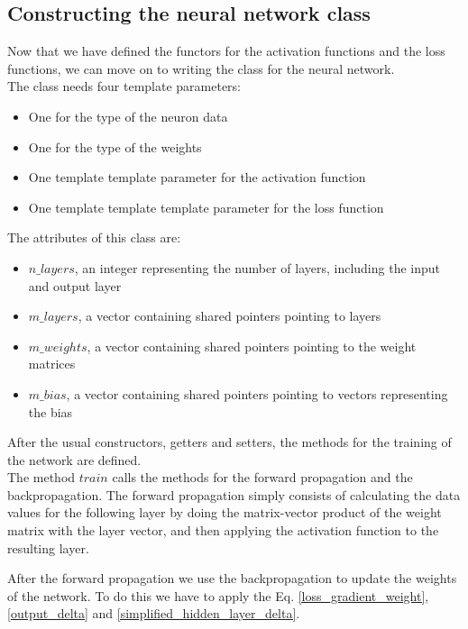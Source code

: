 \documentclass[12pt]{article}
\begin{document}


\subsection{Constructing the neural network class}
Now that we have defined the functors for the activation functions and the loss functions, we can move on to
writing the class for the neural network. \\
The class needs four template parameters:
\begin{itemize}
  \item One for the type of the neuron data
  \item One for the type of the weights
  \item One template template parameter for the activation function
  \item One template template template parameter for the loss function
\end{itemize}



\noindent The attributes of this class are:
\begin{itemize}
  \item $n\_layers$, an integer representing the number of layers, including the input and output layer
  \item $m\_layers$, a vector containing shared pointers pointing to layers
  \item $m\_weights$, a vector containing shared pointers pointing to the weight matrices
  \item $m\_bias$, a vector containing shared pointers pointing to vectors representing the bias
\end{itemize}
After the usual constructors, getters and setters, the methods for the training of the network are defined. \\
The method $train$ calls the methods for the forward propagation and the backpropagation. The forward 
propagation simply consists of calculating the data values for the following layer by doing the matrix-vector 
product of the weight matrix with the layer vector, and then applying the activation function to the 
resulting layer.



\noindent After the forward propagation we use the backpropagation to update the weights of the network. To 
do this we have to apply the Eq. \ref{loss_gradient_weight}, \ref{output_delta} and 
\ref{simplified_hidden_layer_delta}.
\end{document}
